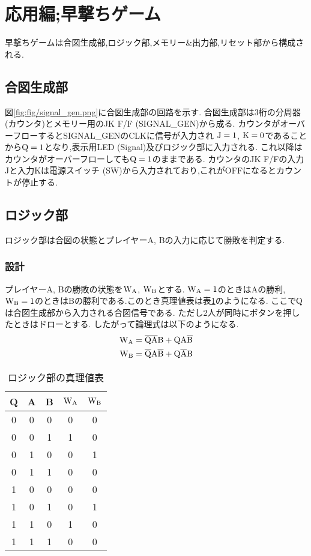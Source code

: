 \section{応用編;早撃ちゲーム}
早撃ちゲームは合図生成部,ロジック部,メモリー\&出力部,リセット部から構成される.
\subsection{合図生成部}
図\ref{fig:fig/signal_gen.png}に合図生成部の回路を示す.
合図生成部は3桁の分周器(カウンタ)とメモリー用のJK F/F (SIGNAL\_GEN)から成る.
カウンタがオーバーフローするとSIGNAL\_GENのCLKに信号が入力され
${\rm J}=1$, ${\rm K}=0$であることから${\rm Q}=1$となり,表示用LED (Signal)及びロジック部に入力される.
これ以降はカウンタがオーバーフローしても${\rm Q}=1$のままである.
カウンタのJK F/Fの入力Jと入力Kは電源スイッチ (SW)から入力されており,これがOFFになるとカウントが停止する.
\subsection{ロジック部}
ロジック部は合図の状態とプレイヤーA, Bの入力に応じて勝敗を判定する.
\subsubsection{設計}
プレイヤーA, Bの勝敗の状態を$\rm W_A$, $\rm W_B$とする.
$\rm W_A=1$のときはAの勝利,
$\rm W_B=1$のときはBの勝利である.このとき真理値表は表\ref{tab:WAWB}のようになる.
ここで$\rm Q$は合図生成部から入力される合図信号である.
ただし2人が同時にボタンを押したときはドローとする.
したがって論理式は以下のようになる.
\begin{align}
  \begin{split}
    {\rm W_A}=\overline{\rm QA}{\rm B}+{\rm QA}\overline{\rm B}\\
    {\rm W_B}=\overline{\rm Q}{\rm A}\overline{\rm B}+{\rm Q}\overline{\rm A}{\rm B}\\
  \end{split}
\end{align}
\begin{table}[h]
  \centering
  \begin{tabular}{ccc|cc}
    \hline
    Q & A & B & $\rm W_A$ & $\rm W_B$ \\
    \hline
    0 & 0 & 0 & 0 & 0 \\
    0 & 0 & 1 & 1 & 0 \\
    0 & 1 & 0 & 0 & 1 \\
    0 & 1 & 1 & 0 & 0 \\
    1 & 0 & 0 & 0 & 0 \\
    1 & 0 & 1 & 0 & 1 \\
    1 & 1 & 0 & 1 & 0 \\
    1 & 1 & 1 & 0 & 0 \\
    \hline
  \end{tabular}
  \caption{ロジック部の真理値表}
  \label{tab:WAWB}
\end{table}

